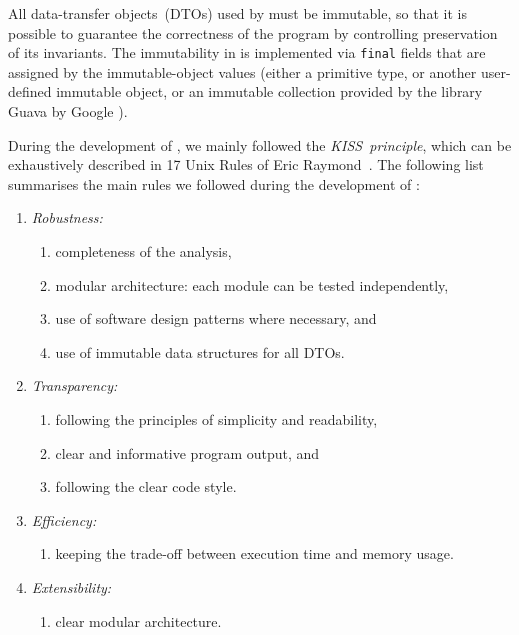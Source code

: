 All data-transfer objects~(DTOs) used by \porthos[2] must be immutable, so that it is possible to guarantee the correctness of the program by controlling preservation of its invariants.
The immutability in \porthos[2] is implemented via \texttt{final} fields that are assigned by the immutable-object values (either a primitive type, or another user-defined immutable object, or an immutable collection provided by the library Guava by Google%
%
%
%
).

During the development of \porthos[2], we mainly followed the \textit{KISS~principle}, which can be exhaustively described in 17 Unix Rules of Eric Raymond~\cite{raymond2003art}.
The following list summarises the main rules we followed during the development of \porthos[2]:

\vspace{0.5em}
\begin{enumerate}[nolistsep,label=\arabic*.]
  \item \textit{Robustness:}
    \begin{enumerate}[label*=\arabic*.]
      \item completeness of the analysis,
      \item modular architecture: each module can be tested independently,
      \item use of software design patterns where necessary, and
      \item use of immutable data structures for all DTOs.
    \end{enumerate}
  \item \textit{Transparency:}
    \begin{enumerate}[label*=\arabic*.]
      \item following the principles of simplicity and readability,
      \item clear and informative program output, and
      \item following the clear code style.
    \end{enumerate}
  \item \textit{Efficiency:}
    \begin{enumerate}[label*=\arabic*.]%
      \item keeping the trade-off between execution time and memory usage.
    \end{enumerate}
  \item \textit{Extensibility:}
    \begin{enumerate}[label*=\arabic*.]%
      \item clear modular architecture.
    \end{enumerate}
\end{enumerate}

